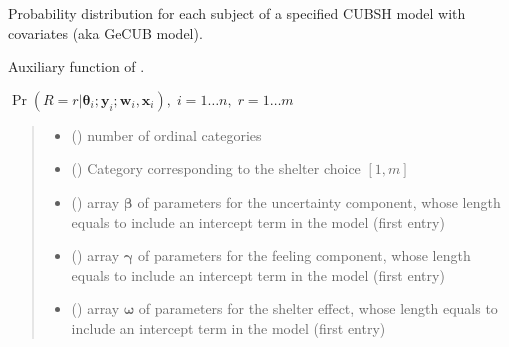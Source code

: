 \documentclass[letterpaper,10pt,english]{sphinxmanual}
\begin{document}
\begin{fulllineitems}
\label{\detokenize{cubmods:cubmods.cubsh_ywx.pmfi}}
\pysigstartsignatures
{}
\pysigstopsignatures
\sphinxAtStartPar
Probability distribution for each subject of a specified CUBSH model with covariates
(aka GeCUB model).

\sphinxAtStartPar
Auxiliary function of .

\sphinxAtStartPar
\(\Pr(R = r | \pmb\theta_i ; \pmb y_i; \pmb w_i, \pmb x_i),\; i=1 \ldots n ,\; r=1 \ldots m\)
\begin{quote}\begin{description}
\begin{itemize}
\item {} 
\sphinxAtStartPar
{} () \textendash{} number of ordinal categories

\item {} 
\sphinxAtStartPar
{} () \textendash{} Category corresponding to the shelter choice \([1,m]\)

\item {} 
\sphinxAtStartPar
{} () \textendash{} array \(\pmb \beta\) of parameters for the uncertainty component, whose length equals 
 to include an intercept term in the model (first entry)

\item {} 
\sphinxAtStartPar
{} () \textendash{} array \(\pmb \gamma\) of parameters for the feeling component, whose length equals 
 to include an intercept term in the model (first entry)

\item {} 
\sphinxAtStartPar
{} () \textendash{} array \(\pmb \omega\) of parameters for the shelter effect, whose length equals 
 to include an intercept term in the model (first entry)


\end{itemize}
\end{description}
\end{quote}
\end{fulllineitems}
\end{document}
